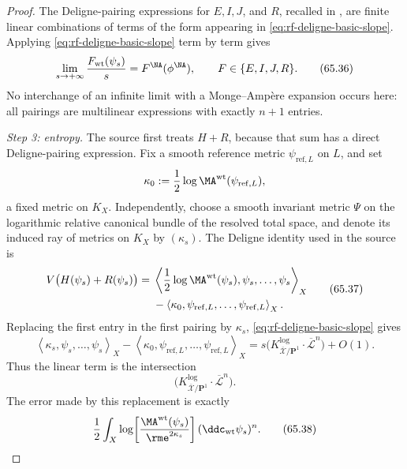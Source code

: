 \begin{proof}
The Deligne-pairing expressions for $E,I,J$, and $R$, recalled in
\cite[Lemma~1.2]{BHJ19}, are finite linear combinations of terms of the
form appearing in \eqref{eq:rf-deligne-basic-slope}.  Applying
\eqref{eq:rf-deligne-basic-slope} term by term gives
\[
 \lim_{s\to+\infty}\frac{F_{\mathrm{wt}}(\psi_s)}s
     =F^{\NA}(\phi^{\NA}),
 \qquad F\in\{E,I,J,R\}.
\tag{65.36}\label{eq:rf-deligne-functional-slopes}
\]
No interchange of an infinite limit with a Monge--Amp\`ere expansion occurs
here: all pairings are multilinear expressions with exactly $n+1$
entries.

\smallskip
\noindent\emph{Step 3: entropy.}
The source first treats $H+R$, because that sum has a direct
Deligne-pairing expression.  Fix a smooth reference metric
$\psi_{\mathrm{ref},L}$ on $L$, and set
\[
        \kappa_0:=\frac12\log\MA^{\mathrm{wt}}(\psi_{\mathrm{ref},L}),
\]
a fixed metric on $K_X$.  Independently, choose a smooth invariant
metric $\Psi$ on the logarithmic relative canonical bundle of the
resolved total space, and denote its induced ray of metrics on $K_X$ by
$(\kappa_s)$.  The Deligne identity used in the source is
\[
\begin{aligned}
 V\bigl(H(\psi_s)+R(\psi_s)\bigr)
  ={}&
 \left\langle\frac12\log\MA^{\mathrm{wt}}(\psi_s),
       \psi_s,\ldots,\psi_s\right\rangle_X \\
 &-\left\langle\kappa_0,
       \psi_{\mathrm{ref},L},\ldots,
       \psi_{\mathrm{ref},L}\right\rangle_X .
\end{aligned}
\tag{65.37}\label{eq:rf-entropy-deligne-decomposition}
\]
Replacing the first entry in the first pairing by $\kappa_s$,
\eqref{eq:rf-deligne-basic-slope} gives
\[
 \left\langle\kappa_s,\psi_s,\ldots,\psi_s\right\rangle_X
 -\left\langle\kappa_0,\psi_{\mathrm{ref},L},\ldots,
                         \psi_{\mathrm{ref},L}\right\rangle_X
 =s\bigl(K^{\log}_{\overline{\mathcal X}/\mathbf P^1}
              \cdot\overline{\mathcal L}^{n}\bigr)+O(1).
\]
Thus the linear term is the intersection
\[
       \bigl(K^{\log}_{\overline{\mathcal X}/\mathbf P^1}
              \cdot\overline{\mathcal L}^{n}\bigr).
\]
The error made by this replacement is exactly
\[
 \frac12\int_X
   \log\!\left[
      \frac{\MA^{\mathrm{wt}}(\psi_s)}
           {\rme^{2\kappa_s}}
   \right](\ddc_{\mathrm{wt}}\psi_s)^n .
\tag{65.38}\label{eq:rf-entropy-replacement-error}
\]


\end{proof}
